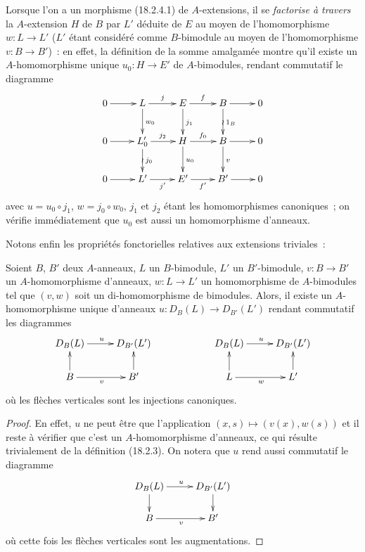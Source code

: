 \begin{env}[18.2.8]
Lorsque l'on a un morphisme (18.2.4.1) de $A$-extensions, il se \emph{factorise
à travers} la $A$-extension $H$ de $B$ par $L'$ déduite de $E$ au moyen de
l'homomorphisme $w:L\to L'$ ($L'$ étant considéré comme $B$-bimodule au moyen
de l'homomorphisme $v:B\to B'$)~: en effet, la définition de la somme amalgamée
montre qu'il existe un $A$-homomorphisme unique $u_0:H\to E'$ de
$A$-bimodules, rendant commutatif le diagramme
\[
  \xymatrix{
    0\ar[r] & L\ar[r]^j\ar[d]^{w_0} & E\ar[r]^f\ar[d]^{j_1}
      & B\ar[r]\ar[d]^{1_B}\ar@{}[d]|{\wr} & 0\\
    0\ar[r] & L'_0\ar[r]^{j_2}\ar[d]^{j_0}\ar@{}[d]|{\wr}
      & H\ar[r]^{f_0}\ar[d]^{u_0} & B\ar[r]\ar[d]^v & 0\\
    0\ar[r] & L'\ar[r]_{j'} & E'\ar[r]_{f'} & B'\ar[r] & 0
  }
\]
avec $u=u_0\circ j_1$, $w=j_0\circ w_0$, $j_1$ et $j_2$ étant les
homomorphismes canoniques~; on vérifie immédiatement que $u_0$ est aussi un
homomorphisme d'anneaux.

Notons enfin les propriétés fonctorielles relatives aux extensions triviales~:
\end{env}

\begin{proposition}[18.2.9]
\label{0.18.2.9-fr}
Soient $B$, $B'$ deux $A$-anneaux, $L$ un $B$-bimodule, $L'$ un
$B'$-bimodule, $v:B\to B'$ un $A$-homomorphisme d'anneaux, $w:L\to L'$ un
homomorphisme de $A$-bimodules tel que $(v,w)$ soit un di-homomorphisme de
bimodules. Alors, il existe un $A$-homomorphisme unique d'anneaux
$u:D_B(L)\to D_{B'}(L')$ rendant commutatif les diagrammes
\[
  \xymatrix@C=2.2pc@R=1.6pc{
    D_B(L)\ar[r]^u & D_{B'}(L') & & D_B(L)\ar[r]^u & D_{B'}(L')\\
    B\ar[u]\ar[r]_v & B'\ar[u] & & L\ar[u]\ar[r]_w & L'\ar[u]
  }
\]
où les flèches verticales sont les injections canoniques.
\end{proposition}


\begin{proof}
En effet, $u$ ne peut être que l'application
$(x,s)\mapsto(v(x),w(s))$ et il reste à vérifier que c'est un
$A$-homomorphisme d'anneaux, ce qui résulte trivialement de la définition
(18.2.3). On notera que $u$ rend aussi commutatif le diagramme
\[
  \xymatrix@C=2.2pc@R=1.5pc{
    D_B(L)\ar[r]^u\ar[d] & D_{B'}(L')\ar[d]\\
    B\ar[r]_v & B'
  }
\]
où cette fois les flèches verticales sont les augmentations.
\end{proof}

